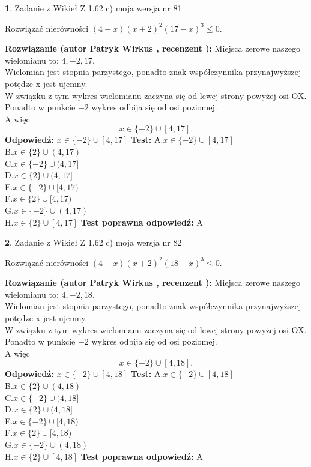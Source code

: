 \documentclass[12pt, a4paper]{article}
\theoremstyle{definition} %
\newtheorem{zad}{}
\newcommand{\zadStart}[1]{\begin{zad}#1\newline}
\newcommand{\zadStop}{\end{zad}}
\newcommand{\rozwStart}[2]{\noindent \textbf{Rozwiązanie (autor #1 , recenzent #2): }\newline}
\newcommand{\rozwStop}{\newline}
\newcommand{\odpStart}{\noindent \textbf{Odpowiedź:}\newline}
\newcommand{\odpStop}{\newline}
\newcommand{\testStart}{\noindent \textbf{Test:}\newline}
\newcommand{\testStop}{\newline}
\newcommand{\kluczStart}{\noindent \textbf{Test poprawna odpowiedź:}\newline}
\newcommand{\kluczStop}{\newline}
\begin{document}
\zadStart{Zadanie z Wikieł Z 1.62 c) moja wersja nr 81}

Rozwiązać nierówności $(4-x)(x+2)^{2}(17-x)^{3}\le0$.
\zadStop
\rozwStart{Patryk Wirkus}{}
Miejsca zerowe naszego wielomianu to: $4, -2, 17$.\\
Wielomian jest stopnia parzystego, ponadto znak współczynnika przy\linebreak najwyższej potędze x jest ujemny.\\ W związku z tym wykres wielomianu zaczyna się od lewej strony powyżej osi OX.\\
Ponadto w punkcie $-2$ wykres odbija się od osi poziomej.\\
A więc $$x \in \{-2\} \cup [4,17].$$
\rozwStop
\odpStart
$x \in \{-2\} \cup [4,17]$
\odpStop
\testStart
A.$x \in \{-2\} \cup [4,17]$\\
B.$x \in \{2\} \cup (4,17)$\\
C.$x \in \{-2\} \cup (4,17]$\\
D.$x \in \{2\} \cup (4,17]$\\
E.$x \in \{-2\} \cup [4,17)$\\
F.$x \in \{2\} \cup [4,17)$\\
G.$x \in \{-2\} \cup (4,17)$\\
H.$x \in \{2\} \cup [4,17]$
\testStop
\kluczStart
A
\kluczStop



\zadStart{Zadanie z Wikieł Z 1.62 c) moja wersja nr 82}

Rozwiązać nierówności $(4-x)(x+2)^{2}(18-x)^{3}\le0$.
\zadStop
\rozwStart{Patryk Wirkus}{}
Miejsca zerowe naszego wielomianu to: $4, -2, 18$.\\
Wielomian jest stopnia parzystego, ponadto znak współczynnika przy\linebreak najwyższej potędze x jest ujemny.\\ W związku z tym wykres wielomianu zaczyna się od lewej strony powyżej osi OX.\\
Ponadto w punkcie $-2$ wykres odbija się od osi poziomej.\\
A więc $$x \in \{-2\} \cup [4,18].$$
\rozwStop
\odpStart
$x \in \{-2\} \cup [4,18]$
\odpStop
\testStart
A.$x \in \{-2\} \cup [4,18]$\\
B.$x \in \{2\} \cup (4,18)$\\
C.$x \in \{-2\} \cup (4,18]$\\
D.$x \in \{2\} \cup (4,18]$\\
E.$x \in \{-2\} \cup [4,18)$\\
F.$x \in \{2\} \cup [4,18)$\\
G.$x \in \{-2\} \cup (4,18)$\\
H.$x \in \{2\} \cup [4,18]$
\testStop
\kluczStart
A
\kluczStop
\end{document}
